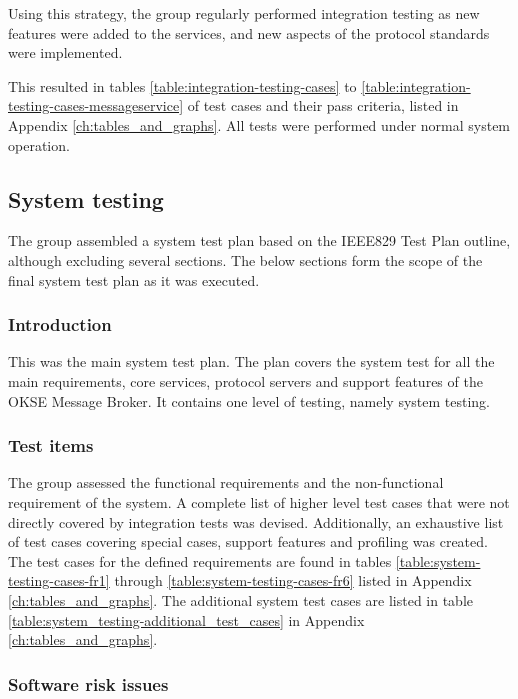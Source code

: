 Using this strategy, the group regularly performed integration testing as new features were added to the services, and new aspects of the protocol standards were implemented.

This resulted in tables \ref{table:integration-testing-cases} to \ref{table:integration-testing-cases-messageservice} of test cases and their pass criteria, listed in Appendix \ref{ch:tables_and_graphs}. All tests were performed under normal system operation.

\subsection{System testing}
\label{subsec:testing-test_execution-system_testing}

The group assembled a system test plan based on the IEEE829 Test Plan outline, although excluding several sections. The below sections form the scope of the final system test plan as it was executed.

\subsubsection{Introduction}

This was the main system test plan. The plan covers the system test for all the main requirements, core services, protocol servers and support features of the OKSE Message Broker. It contains one level of testing, namely system testing.

\subsubsection{Test items}

The group assessed the functional requirements and the non-functional requirement of the system. A complete list of higher level test cases that were not directly covered by integration tests was devised. Additionally, an exhaustive list of test cases covering special cases, support features and profiling was created. The test cases for the defined requirements are found in tables \ref{table:system-testing-cases-fr1} through \ref{table:system-testing-cases-fr6} listed in Appendix \ref{ch:tables_and_graphs}. The additional system test cases are listed in table \ref{table:system_testing-additional_test_cases} in Appendix \ref{ch:tables_and_graphs}.

\subsubsection{Software risk issues}

